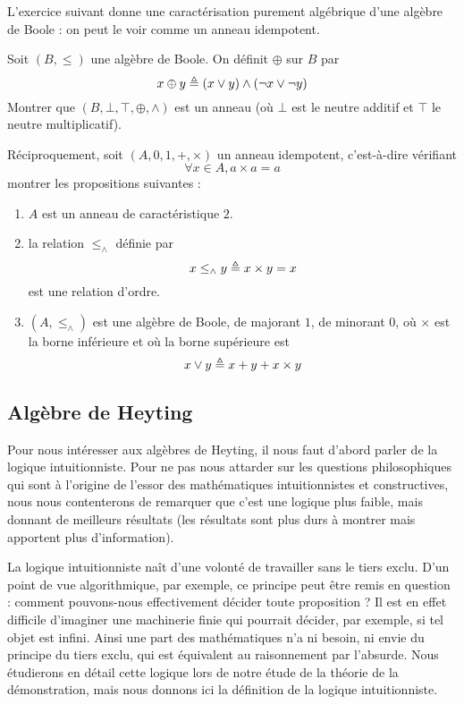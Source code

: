 L'exercice suivant donne une caractérisation purement algébrique d'une algèbre
de Boole : on peut le voir comme un anneau idempotent.

\begin{exercise}
  Soit $(B,\leq)$ une algèbre de Boole. On définit $\oplus$ sur $B$ par
  \[x\oplus y \triangleq (x\lor y) \land (\lnot x \lor \lnot y)\]
  Montrer que $(B,\bot,\top,\oplus,\land)$ est un anneau (où $\bot$ est le neutre
  additif et $\top$ le neutre multiplicatif).

  Réciproquement, soit $(A,0,1,+,\times)$ un anneau idempotent, c'est-à-dire
  vérifiant
  \[\forall x\in A, a\times a = a\]
  montrer les propositions suivantes :
  \begin{enumerate}[label=(\roman*)]
  \item $A$ est un anneau de caractéristique $2$.
  \item la relation $\leq_\land$ définie par
    \[x\leq_\land y \triangleq x\times y = x\]
    est une relation d'ordre.
  \item $(A,\leq_\land)$ est une algèbre de Boole, de majorant $1$, de minorant
    $0$, où $\times$ est la borne inférieure et où la borne supérieure est
    \[x\lor y \triangleq x + y + x \times y\]
  \end{enumerate}
\end{exercise}

\subsection{Algèbre de Heyting}

Pour nous intéresser aux algèbres de Heyting, il nous faut d'abord parler de la
logique intuitionniste. Pour ne pas nous attarder sur les questions
philosophiques qui sont à l'origine de l'essor des mathématiques intuitionnistes
et constructives, nous nous contenterons de remarquer que c'est une logique plus
faible, mais donnant de meilleurs résultats (les résultats sont plus durs à
montrer mais apportent plus d'information).

La logique intuitionniste naît d'une volonté de travailler sans le tiers exclu.
D'un point de vue algorithmique, par exemple, ce principe peut être remis en
question : comment pouvons-nous effectivement décider toute proposition ? Il
est en effet difficile d'imaginer une machinerie finie qui pourrait décider,
par exemple, si tel objet est infini. Ainsi une part des mathématiques n'a ni
besoin, ni envie du principe du tiers exclu, qui est équivalent au raisonnement
par l'absurde. Nous étudierons en détail cette logique lors de notre étude de la
théorie de la démonstration, mais nous donnons ici la définition de la logique
intuitionniste.


